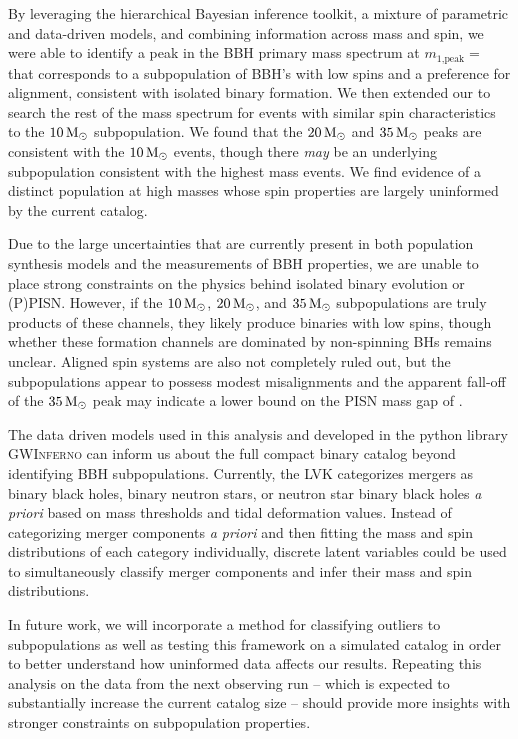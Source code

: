 By leveraging the hierarchical Bayesian inference toolkit, a mixture of parametric and data-driven models, and combining information across mass and spin, we were able to identify a peak in the BBH primary mass spectrum at $m_\text{1,peak} = $ \result{$\CIPlusMinus{\macros[Mass][Base][PeakA][max]}$ \msun} that corresponds to a subpopulation of BBH's with low spins and a preference for alignment, consistent with isolated binary formation. We then extended our \base{} to search the rest of the mass spectrum for events with similar spin characteristics to the $10{\,\rm M}_\odot$ subpopulation. We found that the $20{\,\rm M}_\odot$ and $35{\,\rm M}_\odot$ peaks are consistent with the $10{\,\rm M}_\odot$ events, though there \textit{may} be an underlying subpopulation consistent with the highest mass events. We find evidence of a distinct population at high masses whose spin properties are largely uninformed by the current catalog.

Due to the large uncertainties that are currently present in both population synthesis models and the measurements of BBH properties, we are unable to place strong constraints on the physics behind isolated binary evolution or (P)PISN. However, if the $10{\,\rm M}_\odot$, $20{\,\rm M}_\odot$, and $35{\,\rm M}_\odot$ subpopulations are truly products of these channels, they likely produce binaries with low spins, though whether these formation channels are dominated by non-spinning BHs remains unclear. Aligned spin systems are also not completely ruled out, but the subpopulations appear to possess modest misalignments and the apparent fall-off of the $35{\,\rm M}_\odot$ peak may indicate a lower bound on the PISN mass gap of \result{$\CIPlusMinus{\macros[Mass][Composite][ContinuumA][99percentile]}$ \msun}.

The data driven models used in this analysis and developed in the python library \textsc{GWInferno} can inform us about the full compact binary catalog beyond identifying BBH subpopulations. Currently, the LVK categorizes mergers as binary black holes, binary neutron stars, or neutron star binary black holes \emph{a priori} based on mass thresholds and tidal deformation values. Instead of categorizing merger components \emph{a priori} and then fitting the mass and spin distributions of each category individually, discrete latent variables could be used to simultaneously classify merger components and infer their mass and spin distributions.

In future work, we will incorporate a method for classifying outliers to subpopulations as well as testing this framework on a simulated catalog in order to better understand how uninformed data affects our results. Repeating this analysis on the data from the next observing run -- which is expected to substantially increase the current catalog size -- should provide more insights with stronger constraints on subpopulation properties.
